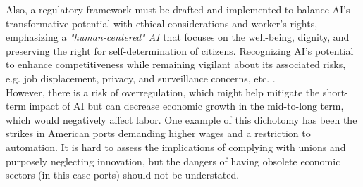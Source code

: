 Also, a regulatory framework must be drafted and implemented to balance AI's transformative potential with ethical considerations and worker's rights, emphasizing a \textit{"human-centered" AI} that focuses on the well-being, dignity, and preserving the right for self-determination of citizens. Recognizing AI's potential to enhance competitiveness while remaining vigilant about its associated risks, e.g. job displacement, privacy, and surveillance concerns, etc. \parencite[cf.][p. 59-66]{krzywdzinski_promoting_2023}. \\
However, there is a risk of overregulation, which might help mitigate the short-term impact of AI but can decrease economic growth in the mid-to-long term, which would negatively affect labor. One example of this dichotomy has been the strikes in American ports demanding higher wages and a restriction to automation. It is hard to assess the implications of complying with unions and purposely neglecting innovation, but the dangers of having obsolete economic sectors (in this case ports) should not be understated.
